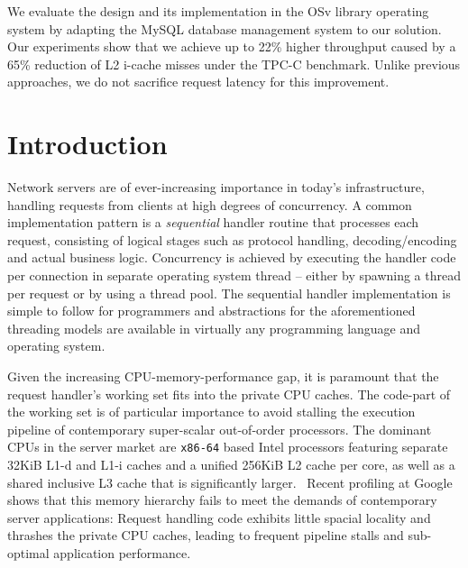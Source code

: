 \documentclass[12pt,a4paper]{book}
\begin{document}
We evaluate the design and its implementation in the OSv library operating system by adapting the MySQL database management system to our solution.
Our experiments show that we achieve up to 22\% higher throughput caused by a 65\% reduction of L2 i-cache misses under the TPC-C benchmark.
Unlike previous approaches, we do not sacrifice request latency for this improvement.

\mainmatter
\cleardoublepage
{}
{}
\tableofcontents

\chapter{Introduction}
Network servers are of ever-increasing importance in today's infrastructure, handling requests from clients at high degrees of concurrency.
A common implementation pattern is a \emph{sequential} handler routine that processes each request, consisting of logical stages such as protocol handling, decoding/encoding and actual business logic.
Concurrency is achieved by executing the handler code per connection in separate operating system thread -- either by spawning a thread per request or by using a thread pool.
The sequential handler implementation is simple to follow for programmers and abstractions for the aforementioned threading models are available in virtually any programming language and operating system.~\cite{flashwebsrv,c10k}

Given the increasing CPU-memory-performance gap, it is paramount that the request handler's working set fits into the private CPU caches.
The code-part of the working set is of particular importance to avoid stalling the execution pipeline of contemporary super-scalar out-of-order processors.
The dominant CPUs in the server market are \texttt{x86-64} based Intel processors featuring separate 32KiB L1-d and L1-i caches and a unified 256KiB L2 cache per core, as well as a shared inclusive L3 cache that is significantly larger.~\cite{nehalemCacheHierarchy}
Recent profiling at Google shows that this memory hierarchy fails to meet the demands of contemporary server applications:
Request handling code exhibits little spacial locality and thrashes the private CPU caches, leading to frequent pipeline stalls and sub-optimal application performance.\cite{kanev2015profiling}
\end{document}
